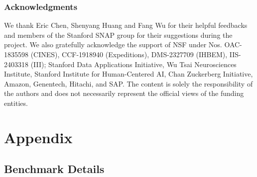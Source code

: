 \documentclass{article} %
\begin{document}
\subsubsection*{Acknowledgments}
We thank Eric Chen, Shenyang Huang and Fang Wu for their helpful feedbacks and members of the Stanford SNAP group for their suggestions during the project.
We also gratefully acknowledge the support of NSF under Nos. OAC-1835598 (CINES), CCF-1918940 (Expeditions), DMS-2327709 (IHBEM), IIS-2403318 (III); Stanford Data Applications Initiative, Wu Tsai Neurosciences Institute, Stanford Institute for Human-Centered AI, Chan Zuckerberg Initiative, Amazon, Genentech, Hitachi, and SAP. The content is solely the responsibility of the authors and does not necessarily represent the official views of the funding entities.







\newpage
\appendix

\section{Appendix}


\subsection{Benchmark Details}
\label{sec:appendix-relbench}
\end{document}
